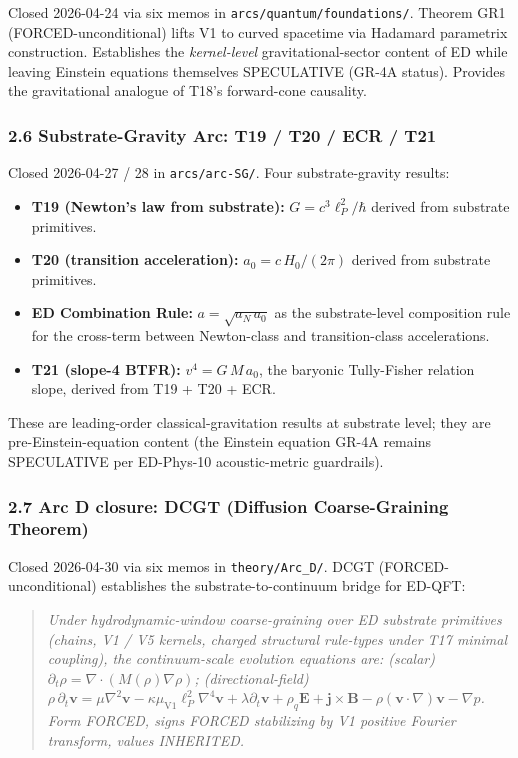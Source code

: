 \documentclass[
  11pt,
  a4paper,
]{article}
\providecommand{\tightlist}{%
  \setlength{\itemsep}{0pt}\setlength{\parskip}{0pt}}
\begin{document}
Closed 2026-04-24 via six memos in \texttt{arcs/quantum/foundations/}.
Theorem GR1 (FORCED-unconditional) lifts V1 to curved spacetime via
Hadamard parametrix construction. Establishes the \emph{kernel-level}
gravitational-sector content of ED while leaving Einstein equations
themselves SPECULATIVE (GR-4A status). Provides the gravitational
analogue of T18's forward-cone causality.

\subsubsection{2.6 Substrate-Gravity Arc: T19 / T20 / ECR /
T21}\label{substrate-gravity-arc-t19-t20-ecr-t21}

Closed 2026-04-27 / 28 in \texttt{arcs/arc-SG/}. Four substrate-gravity
results:

\begin{itemize}
\tightlist
\item
  \textbf{T19 (Newton's law from substrate):} \(G = c^3\ell_P^2/\hbar\)
  derived from substrate primitives.
\item
  \textbf{T20 (transition acceleration):} \(a_0 = c\,H_0/(2\pi)\)
  derived from substrate primitives.
\item
  \textbf{ED Combination Rule:} \(a = \sqrt{a_N\,a_0}\) as the
  substrate-level composition rule for the cross-term between
  Newton-class and transition-class accelerations.
\item
  \textbf{T21 (slope-4 BTFR):} \(v^4 = G\,M\,a_0\), the baryonic
  Tully-Fisher relation slope, derived from T19 + T20 + ECR.
\end{itemize}

These are leading-order classical-gravitation results at substrate
level; they are pre-Einstein-equation content (the Einstein equation
GR-4A remains SPECULATIVE per ED-Phys-10 acoustic-metric guardrails).

\subsubsection{2.7 Arc D closure: DCGT (Diffusion Coarse-Graining
Theorem)}\label{arc-d-closure-dcgt-diffusion-coarse-graining-theorem}

Closed 2026-04-30 via six memos in \texttt{theory/Arc\_D/}. DCGT
(FORCED-unconditional) establishes the substrate-to-continuum bridge for
ED-QFT:

\begin{quote}
\emph{Under hydrodynamic-window coarse-graining over ED substrate
primitives (chains, V1 / V5 kernels, charged structural rule-types under
T17 minimal coupling), the continuum-scale evolution equations are:
(scalar) \(\partial_t\rho = \nabla\cdot(M(\rho)\nabla\rho)\);
(directional-field)
\(\rho\,\partial_t\mathbf{v} = \mu\nabla^2\mathbf{v} - \kappa\mu_\mathrm{V1}\ell_P^2\nabla^4\mathbf{v} + \lambda\partial_t\mathbf{v} + \rho_q\mathbf{E} + \mathbf{j}\times\mathbf{B} - \rho(\mathbf{v}\cdot\nabla)\mathbf{v} - \nabla p\).
Form FORCED, signs FORCED stabilizing by V1 positive Fourier transform,
values INHERITED.}
\end{quote}
\end{document}
